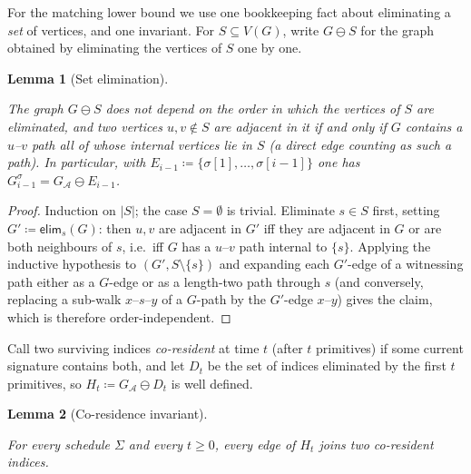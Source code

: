 \documentclass[sn-mathphys, natbib=false]{sn-jnl}
\theoremstyle{plain}
\newtheorem{lemma}{Lemma}
\theoremstyle{definition}
\newcommand{\verticesp}[1]{V(#1)}
\newcommand{\eliminatevg}[2]{\mathsf{elim}_{#1}(#2)}
\newif\ifshowchanges
\newcommand{\rev}[1]{%
  \ifshowchanges
    {\color{red} #1}%
  \else
    #1%
  \fi
}
\def\calA{\mathcal{A}}
\begin{document}
\begin{bibunit}[agsm]
\rev{For the matching lower bound we use one bookkeeping fact about eliminating a \emph{set} of vertices, and one invariant. For $S \subseteq \verticesp{G}$, write $G \ominus S$ for the graph obtained by eliminating the vertices of $S$ one by one.}

\begin{lemma}[Set elimination]
\label{lem:set_elim}
\rev{The graph $G \ominus S$ does not depend on the order in which the vertices of $S$ are eliminated, and two vertices $u, v \notin S$ are adjacent in it if and only if $G$ contains a $u$--$v$ path all of whose internal vertices lie in $S$ (a direct edge counting as such a path). In particular, with $E_{i-1} \coloneqq \{\sigma[1], \dots, \sigma[i-1]\}$ one has $G^\sigma_{i-1} = G_\calA \ominus E_{i-1}$.}
\end{lemma}

\begin{proof}
\rev{Induction on $|S|$; the case $S = \emptyset$ is trivial. Eliminate $s \in S$ first, setting $G' \coloneqq \eliminatevg{s}{G}$: then $u, v$ are adjacent in $G'$ iff they are adjacent in $G$ or are both neighbours of $s$, i.e.\ iff $G$ has a $u$--$v$ path internal to $\{s\}$. Applying the inductive hypothesis to $(G', S \setminus \{s\})$ and expanding each $G'$-edge of a witnessing path either as a $G$-edge or as a length-two path through $s$ (and conversely, replacing a sub-walk $x$--$s$--$y$ of a $G$-path by the $G'$-edge $x$--$y$) gives the claim, which is therefore order-independent.}
\end{proof}

\rev{Call two surviving indices \emph{co-resident} at time $t$ (after $t$ primitives) if some current signature contains both, and let $D_t$ be the set of indices eliminated by the first $t$ primitives, so $H_t \coloneqq G_\calA \ominus D_t$ is well defined.}

\begin{lemma}[Co-residence invariant]
\label{lem:tw_coresidence}
\rev{For every schedule $\Sigma$ and every $t \ge 0$, every edge of $H_t$ joins two co-resident indices.}
\end{lemma}


\end{bibunit}
\end{document}
